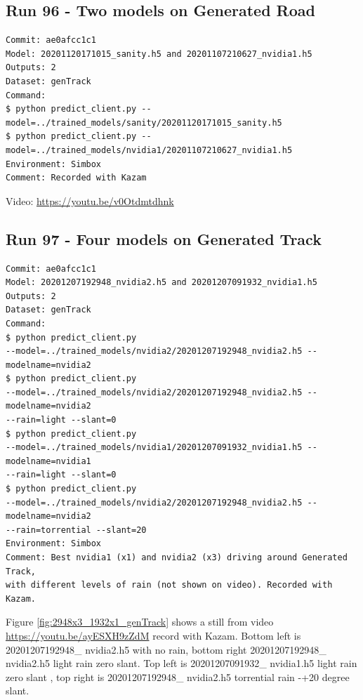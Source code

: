 \subsection{Run 96 - Two models on Generated Road}
\label{app_res:96}
\begin{verbatim}
Commit: ae0afcc1c1
Model: 20201120171015_sanity.h5 and 20201107210627_nvidia1.h5
Outputs: 2
Dataset: genTrack
Command:
$ python predict_client.py --model=../trained_models/sanity/20201120171015_sanity.h5
$ python predict_client.py --model=../trained_models/nvidia1/20201107210627_nvidia1.h5
Environment: Simbox 
Comment: Recorded with Kazam
\end{verbatim}
Video: \url{https://youtu.be/v0Otdmtdhnk}

\subsection{Run 97 - Four models on Generated Track }
\label{app_res:97}
\begin{verbatim}
Commit: ae0afcc1c1
Model: 20201207192948_nvidia2.h5 and 20201207091932_nvidia1.h5
Outputs: 2
Dataset: genTrack
Command:
$ python predict_client.py
--model=../trained_models/nvidia2/20201207192948_nvidia2.h5 --modelname=nvidia2
$ python predict_client.py
--model=../trained_models/nvidia2/20201207192948_nvidia2.h5 --modelname=nvidia2 
--rain=light --slant=0
$ python predict_client.py
--model=../trained_models/nvidia1/20201207091932_nvidia1.h5 --modelname=nvidia1
--rain=light --slant=0
$ python predict_client.py
--model=../trained_models/nvidia2/20201207192948_nvidia2.h5 --modelname=nvidia2
--rain=torrential --slant=20
Environment: Simbox
Comment: Best nvidia1 (x1) and nvidia2 (x3) driving around Generated Track,
with different levels of rain (not shown on video). Recorded with Kazam.
\end{verbatim}
Figure  \ref{fig:2948x3_1932x1_genTrack}  shows a still from video \url{https://youtu.be/ayESXH9zZdM} record with Kazam.
Bottom left is 20201207192948\_ nvidia2.h5 with no rain, bottom right 20201207192948\_ nvidia2.h5 light rain zero slant. Top left is 20201207091932\_ nvidia1.h5 light rain zero slant , top right is 20201207192948\_ nvidia2.h5 torrential rain -+20 degree slant.

